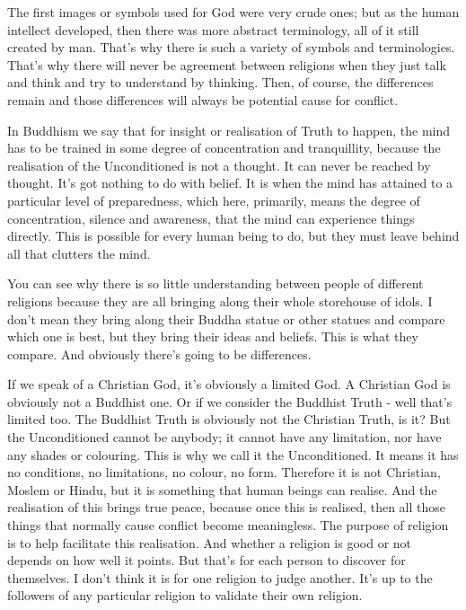 The first images or symbols used for God were very crude ones; but as the human intellect developed, then there was more abstract terminology, all of it still created by man. That's why there is such a variety of symbols and terminologies. That's why there will never be agreement between religions when they just talk and think and try to understand by thinking. Then, of course, the differences remain and those differences will always be potential cause for conflict.

In Buddhism we say that for insight or realisation of Truth to happen, the mind has to be trained in some degree of concentration and tranquillity, because the realisation of the Unconditioned is not a thought. It can never be reached by thought. It's got nothing to do with belief. It is when the mind has attained to a particular level of preparedness, which here, primarily, means the degree of concentration, silence and awareness, that the mind can experience things directly. This is possible for every human being to do, but they must leave behind all that clutters the mind.

You can see why there is so little understanding between people of different religions because they are all bringing along their whole storehouse of idols. I don't mean they bring along their Buddha statue or other statues and compare which one is best, but they bring their ideas and beliefs. This is what they compare. And obviously there's going to be differences.

If we speak of a Christian God, it's obviously a limited God. A Christian God is obviously not a Buddhist one. Or if we consider the Buddhist Truth - well that's limited too. The Buddhist Truth is obviously not the Christian Truth, is it? But the Unconditioned cannot be anybody; it cannot have any limitation, nor have any shades or colouring. This is why we call it the Unconditioned. It means it has no conditions, no limitations, no colour, no form. Therefore it is not Christian, Moslem or Hindu, but it is something that human beings can realise. And the realisation of this brings true peace, because once this is realised, then all those things that normally cause conflict become meaningless. The purpose of religion is to help facilitate this realisation. And whether a religion is good or not depends on how well it points. But that's for each person to discover for themselves. I don't think it is for one religion to judge another. It's up to the followers of any particular religion to validate their own religion.

